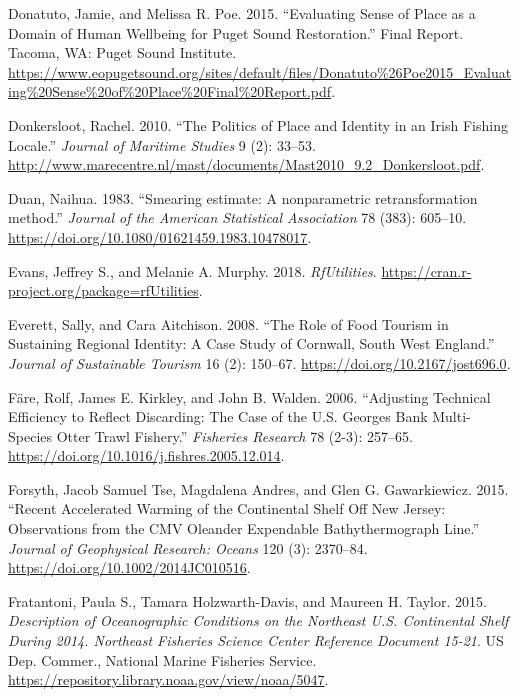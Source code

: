 \documentclass[
]{book}
\begin{document}
\leavevmode\hypertarget{ref-donatuto_evaluating_2015}{}%
Donatuto, Jamie, and Melissa R. Poe. 2015. ``Evaluating Sense of Place as a Domain of Human Wellbeing for Puget Sound Restoration.'' Final Report. Tacoma, WA: Puget Sound Institute. \url{https://www.eopugetsound.org/sites/default/files/Donatuto\%26Poe2015_Evaluating\%20Sense\%20of\%20Place\%20Final\%20Report.pdf}.

\leavevmode\hypertarget{ref-donkersloot_politics_2010}{}%
Donkersloot, Rachel. 2010. ``The Politics of Place and Identity in an Irish Fishing Locale.'' \emph{Journal of Maritime Studies} 9 (2): 33--53. \url{http://www.marecentre.nl/mast/documents/Mast2010_9.2_Donkersloot.pdf}.

\leavevmode\hypertarget{ref-Duan1983}{}%
Duan, Naihua. 1983. ``Smearing estimate: A nonparametric retransformation method.'' \emph{Journal of the American Statistical Association} 78 (383): 605--10. \url{https://doi.org/10.1080/01621459.1983.10478017}.

\leavevmode\hypertarget{ref-rfUtilities-package}{}%
Evans, Jeffrey S., and Melanie A. Murphy. 2018. \emph{RfUtilities}. \url{https://cran.r-project.org/package=rfUtilities}.

\leavevmode\hypertarget{ref-everett_role_2008}{}%
Everett, Sally, and Cara Aitchison. 2008. ``The Role of Food Tourism in Sustaining Regional Identity: A Case Study of Cornwall, South West England.'' \emph{Journal of Sustainable Tourism} 16 (2): 150--67. \url{https://doi.org/10.2167/jost696.0}.

\leavevmode\hypertarget{ref-fare_adjusting_2006}{}%
Färe, Rolf, James E. Kirkley, and John B. Walden. 2006. ``Adjusting Technical Efficiency to Reflect Discarding: The Case of the U.S. Georges Bank Multi-Species Otter Trawl Fishery.'' \emph{Fisheries Research} 78 (2-3): 257--65. \url{https://doi.org/10.1016/j.fishres.2005.12.014}.

\leavevmode\hypertarget{ref-forsyth_recent_2015}{}%
Forsyth, Jacob Samuel Tse, Magdalena Andres, and Glen G. Gawarkiewicz. 2015. ``Recent Accelerated Warming of the Continental Shelf Off New Jersey: Observations from the CMV Oleander Expendable Bathythermograph Line.'' \emph{Journal of Geophysical Research: Oceans} 120 (3): 2370--84. \url{https://doi.org/10.1002/2014JC010516}.

\leavevmode\hypertarget{ref-fratantoni_description_2015}{}%
Fratantoni, Paula S., Tamara Holzwarth-Davis, and Maureen H. Taylor. 2015. \emph{Description of Oceanographic Conditions on the Northeast U.S. Continental Shelf During 2014. Northeast Fisheries Science Center Reference Document 15-21}. US Dep. Commer., National Marine Fisheries Service. \url{https://repository.library.noaa.gov/view/noaa/5047}.
\end{document}
